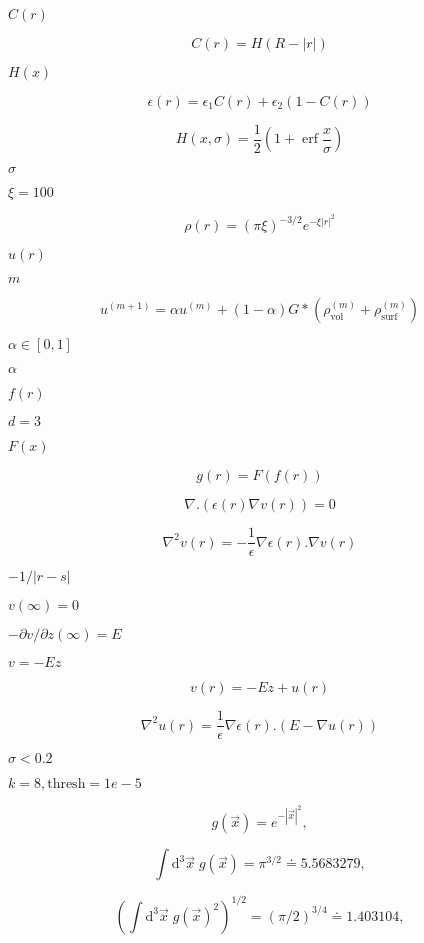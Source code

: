\documentclass{article}
\begin{document}
$C(r)$
\pagebreak

\[ C(r) = H(R-|r|) \]
\pagebreak

$H(x)$
\pagebreak

\[ \epsilon(r) = \epsilon_1 C(r) + \epsilon_2 \left( 1 - C(r) \right) \]
\pagebreak

\[ H(x,\sigma) = \frac{1}{2} \left( 1 + \mathop{\mathrm{erf}} \frac{x}{\sigma} \right) \]
\pagebreak

$\sigma$
\pagebreak

$\xi=100$
\pagebreak

\[ \rho(r) = \left(\pi \xi \right)^{-3/2} e^{-\xi |r|^2} \]
\pagebreak

$u(r)$
\pagebreak

$m$
\pagebreak

\[ u^{(m+1)} = \alpha u^{(m)} + (1-\alpha) G * \left(\rho^{(m)}_{\mbox{vol}} + \rho^{(m)}_{\mbox{surf}} \right) \]
\pagebreak

$ \alpha \in [0,1]$
\pagebreak

$\alpha$
\pagebreak

$f(r)$
\pagebreak

$d=3$
\pagebreak

$F(x)$
\pagebreak

\[ g(r) = F(f(r)) \]
\pagebreak

\[ \nabla . \left( \epsilon(r) \nabla v(r) \right) = 0 \]
\pagebreak

\[ \nabla^2 v(r) = - \frac{1}{\epsilon} \nabla \epsilon(r) . \nabla v(r) \]
\pagebreak

$-1 / |r-s|$
\pagebreak

$v(\infty)=0$
\pagebreak

$- \partial v / \partial z(\infty) = E$
\pagebreak

$v = - E z$
\pagebreak

\[ v(r) = - E z + u(r) \]
\pagebreak

\[ \nabla^2 u(r) = \frac{1}{\epsilon} \nabla \epsilon(r) . \left(E - \nabla u(r) \right) \]
\pagebreak

$\sigma<0.2$
\pagebreak

$k=8, \mbox{thresh}=1e-5$
\pagebreak

\[ g(\vec{x}) = e^{-|\vec{x}|^2}, \]
\pagebreak

\[ \int \mathrm{d}^3 \vec{x} \; g(\vec{x}) = \pi^{3/2} \doteq 5.5683279, \]
\pagebreak

\[ \left( \int \mathrm{d}^3 \vec{x} \; g(\vec{x})^2 \right)^{1/2} = (\pi/2)^{3/4} \doteq 1.403104, \]
\pagebreak
\end{document}
